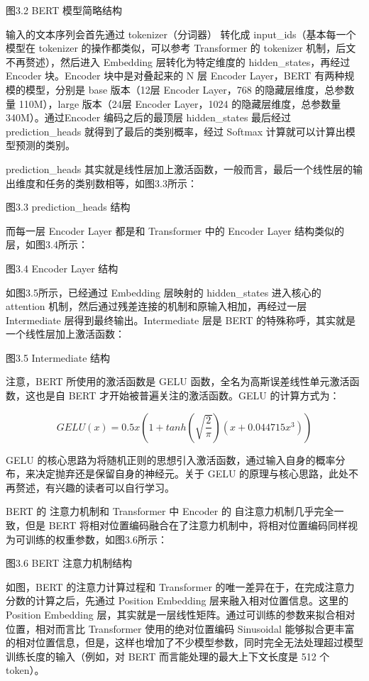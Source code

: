 \documentclass[
]{article}
\begin{document}
图3.2 BERT 模型简略结构

输入的文本序列会首先通过 tokenizer（分词器） 转化成
input\_ids（基本每一个模型在 tokenizer 的操作都类似，可以参考
Transformer 的 tokenizer 机制，后文不再赘述），然后进入 Embedding
层转化为特定维度的 hidden\_states，再经过 Encoder 块。Encoder
块中是对叠起来的 N 层 Encoder Layer，BERT 有两种规模的模型，分别是 base
版本（12层 Encoder Layer，768 的隐藏层维度，总参数量 110M），large
版本（24层 Encoder Layer，1024 的隐藏层维度，总参数量
340M）。通过Encoder 编码之后的最顶层 hidden\_states 最后经过
prediction\_heads 就得到了最后的类别概率，经过 Softmax
计算就可以计算出模型预测的类别。

prediction\_heads
其实就是线性层加上激活函数，一般而言，最后一个线性层的输出维度和任务的类别数相等，如图3.3所示：

图3.3 prediction\_heads 结构

而每一层 Encoder Layer 都是和 Transformer 中的 Encoder Layer
结构类似的层，如图3.4所示：

图3.4 Encoder Layer 结构

如图3.5所示，已经通过 Embedding 层映射的 hidden\_states 进入核心的
attention 机制，然后通过残差连接的机制和原输入相加，再经过一层
Intermediate 层得到最终输出。Intermediate 层是 BERT
的特殊称呼，其实就是一个线性层加上激活函数：

图3.5 Intermediate 结构

注意，BERT 所使用的激活函数是 GELU
函数，全名为高斯误差线性单元激活函数，这也是自 BERT
才开始被普遍关注的激活函数。GELU 的计算方式为：

\[GELU(x) = 0.5x(1 + tanh(\sqrt{\frac{2}{\pi}})(x + 0.044715x^3))\]

GELU
的核心思路为将随机正则的思想引入激活函数，通过输入自身的概率分布，来决定抛弃还是保留自身的神经元。关于
GELU 的原理与核心思路，此处不再赘述，有兴趣的读者可以自行学习。

BERT 的 注意力机制和 Transformer 中 Encoder 的
自注意力机制几乎完全一致，但是 BERT
将相对位置编码融合在了注意力机制中，将相对位置编码同样视为可训练的权重参数，如图3.6所示：

图3.6 BERT 注意力机制结构

如图，BERT 的注意力计算过程和 Transformer
的唯一差异在于，在完成注意力分数的计算之后，先通过 Position Embedding
层来融入相对位置信息。这里的 Position Embedding
层，其实就是一层线性矩阵。通过可训练的参数来拟合相对位置，相对而言比
Transformer 使用的绝对位置编码 Sinusoidal
能够拟合更丰富的相对位置信息，但是，这样也增加了不少模型参数，同时完全无法处理超过模型训练长度的输入（例如，对
BERT 而言能处理的最大上下文长度是 512 个 token）。
\end{document}
